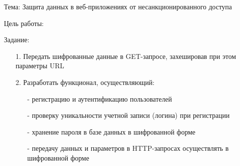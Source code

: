 Тема:
Защита данных в веб-приложениях от несанкционированного доступа

Цель работы:

Задание:

\begin{itemize}
    \item[1.] Передать шифрованные данные в GET-запросе, захешировав при этом параметры URL
    \item[2.] Разработать функционал, осуществляющий:
    \begin{itemize}
        \item[-] регистрацию и аутентификацию пользователей
        \item[-] проверку уникальности учетной записи (логина) при регистрации
        \item[-] хранение пароля в базе данных в шифрованной форме
        \item[-] передачу данных и параметров в HTTP-запросах осуществлять в шифрованной форме
    \end{itemize} 
\end{itemize}
